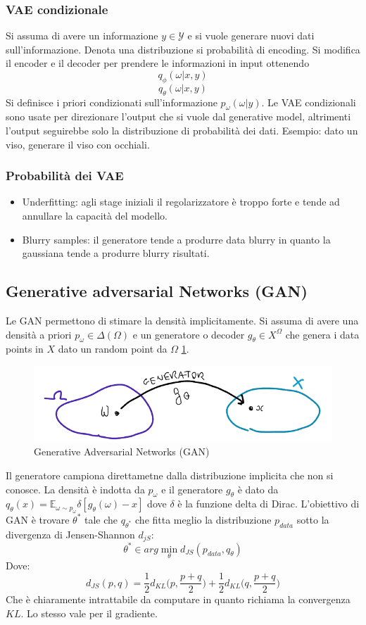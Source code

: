 		\subsubsection{VAE condizionale}
		Si assuma di avere un informazione $y\in\mathcal{Y}$ e si vuole generare nuovi dati sull'informazione.
		Denota una distribuzione si probabilit\`a di encoding.
		Si modifica il encoder e il decoder per prendere le informazioni in input ottenendo
		$$q_\phi(\omega|x,y)$$
		$$q_\theta(\omega|x,y)$$
		Si definisce i priori condizionati sull'informazione $p_\omega(\omega|y)$.
		Le VAE condizionali sono usate per direzionare l'output che si vuole dal generative model, altrimenti l'output seguirebbe solo la distribuzione di probabilit\`a dei dati. 
		Esempio: dato un viso, generare il viso con occhiali.
		
		\subsubsection{Probabilit\`a dei VAE}
		\begin{itemize}
			\item Underfitting: agli stage iniziali il regolarizzatore \`e troppo forte e tende ad annullare la capacit\`a del modello.
			\item Blurry samples: il generatore tende a produrre data blurry in quanto la gaussiana tende a produrre blurry risultati.
		\end{itemize}

	\subsection{Generative adversarial Networks (GAN)}
	Le GAN permettono di stimare la densit\`a implicitamente.
	Si assuma di avere una densit\`a a priori $p_\omega\in\Delta(\Omega)$ e un generatore o decoder $g_\theta\in X^\Omega$ che genera i data points in $X$ dato un random point da $\Omega$ \ref{fig:chapter12-15}.
	\begin{figure}
		\centering
		\includegraphics[width=0.6\linewidth]{imgs/chapter12/img15}
		\caption{Generative Adversarial Networks (GAN)}
		\label{fig:chapter12-15}
	\end{figure}
	Il generatore campiona direttametne dalla distribuzione implicita che non si conosce.
	La densit\`a \`e indotta da $p_\omega$ e il generatore $g_\theta$ \`e dato da $q_\theta(x) = \mathbb{E}_{\omega\sim p_\omega}\delta[g_\theta(\omega) - x]$ dove $\delta$ \`e la funzione delta di Dirac.
	L'obiettivo di GAN \`e trovare $\theta^*$ tale che $q_{\theta^*}$ che fitta meglio la distribuzione $p_{data}$ sotto la divergenza di Jensen-Shannon $d_{jS}$:
	$$\theta^*\in arg\min\limits_{\theta} d_{JS}(p_{data},q_\theta)$$
	Dove:
	$$d_{JS}(p,q) = \frac{1}{2}d_{KL}\bigl(p,\frac{p+q}{2}\bigr)+\frac{1}{2}d_{KL}\bigl(q,\frac{p+q}{2}\bigr)$$
	Che \`e chiaramente intrattabile da computare in quanto richiama la convergenza $KL$.
	Lo stesso vale per il gradiente.

